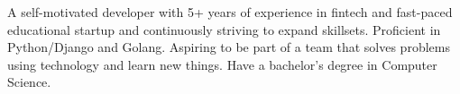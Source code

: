

\begin{cvparagraph}

\vspace{1mm}
A self-motivated developer with 5+ years of experience in fintech and fast-paced educational startup
and continuously striving to expand skillsets. Proficient in Python/Django and Golang.
Aspiring to be part of a team that solves problems using technology and learn new things. Have a bachelor’s degree in Computer Science.
\end{cvparagraph}
